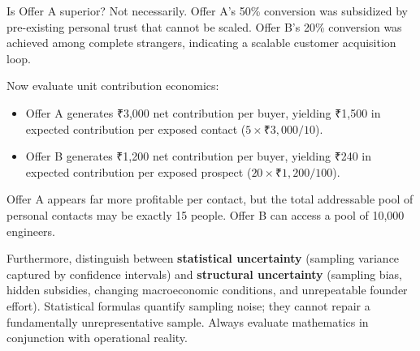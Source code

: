 Is Offer A superior? Not necessarily. Offer A's 50\% conversion was subsidized by pre-existing personal trust that cannot be scaled. Offer B's 20\% conversion was achieved among complete strangers, indicating a scalable customer acquisition loop.

Now evaluate unit contribution economics:
\begin{itemize}
    \item Offer A generates ₹3,000 net contribution per buyer, yielding ₹1,500 in expected contribution per exposed contact ($5 \times ₹3,000 / 10$).
    \item Offer B generates ₹1,200 net contribution per buyer, yielding ₹240 in expected contribution per exposed prospect ($20 \times ₹1,200 / 100$).
\end{itemize}

Offer A appears far more profitable per contact, but the total addressable pool of personal contacts may be exactly 15 people. Offer B can access a pool of 10,000 engineers.

Furthermore, distinguish between \textbf{statistical uncertainty} (sampling variance captured by confidence intervals) and \textbf{structural uncertainty} (sampling bias, hidden subsidies, changing macroeconomic conditions, and unrepeatable founder effort). Statistical formulas quantify sampling noise; they cannot repair a fundamentally unrepresentative sample. Always evaluate mathematics in conjunction with operational reality.
